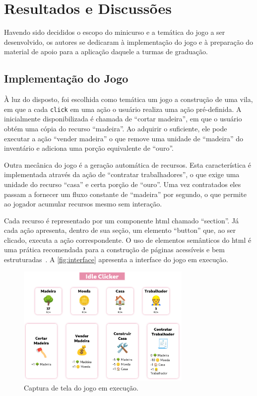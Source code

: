 \section{Resultados e Discussões}%
\label{sec:resultados}%

Havendo sido decididos o escopo do minicurso e a temática do jogo a ser desenvolvido, os autores se dedicaram à implementação do jogo e à preparação do material de apoio para a aplicação daquele a turmas de graduação.

\subsection{Implementação do Jogo}

À luz do disposto, foi escolhida como temática um jogo a construção de uma vila, em que a cada \texttt{click} em uma ação o usuário realiza uma ação pré-definida.
A inicialmente disponibilizada é chamada de ``cortar madeira'', em que o usuário obtém uma cópia do recurso ``madeira''.
Ao adquirir o suficiente, ele pode executar a ação ``vender madeira''
o que remove uma unidade de ``madeira'' do inventário e adiciona uma porção equivalente de ``ouro''.

Outra mecânica do jogo é a geração automática de recursos. Esta característica é implementada através da ação de ``contratar trabalhadores'', o que exige uma unidade do recurso ``casa'' e certa porção de ``ouro''.
Uma vez contratados eles passam a fornecer um fluxo constante de ``madeira'' por segundo, o que permite ao jogador acumular recursos mesmo sem interação.

Cada recurso é representado por um componente \gls{html} chamado ``section''.
Já cada ação apresenta, dentro de sua seção, um elemento ``button'' que, ao ser clicado, executa a ação correspondente.
O uso de elementos semânticos do \gls{html} é uma prática recomendada para a construção de páginas acessíveis e bem estruturadas~\cite{whatwg:2025:html_standard_semantics}.
A \autoref{fig:interface} apresenta a interface do jogo em execução.

\begin{figure}[!htb]%
    \caption{\label{fig:interface}%
        Captura de tela do jogo em execução.%
    }%
    \centering%
    \includegraphics[width=0.75\textwidth]{imagens/interface.png}%
    \legend{\ComponenteFontePropria}%
\end{figure}

